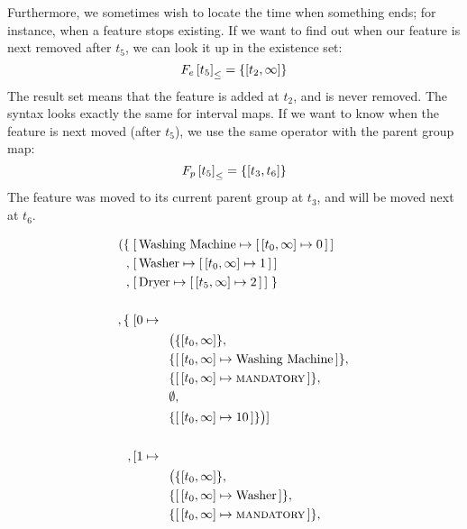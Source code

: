 Furthermore, we sometimes wish to locate the time when something ends; for instance, when a feature stops existing. If we want to find out when our feature is next removed after $t_5$, we can look it up in the existence set:
\[
  \containing{F_e}{t_5} = \set{\interval{t_2}{\forever}}
\]
The result set means that the feature is added at $t_2$, and is never removed. The syntax looks exactly the same for interval maps. If we want to know when the feature is next moved (after $t_5$), we use the same operator with the parent group map:
\[
  \containing{F_p}{t_5} = \set{\interval{t_3}{t_6}}
\]
The feature was moved to its current parent group at $t_3$, and will be moved next at $t_6$.

\begin{figure}[htpb]
  \begin{align*}
    ( \{ \; & \mapping{\text{Washing Machine}}{\intervalmapping{t_0}{\forever}{0}} \\
       ,\; & \mapping{\text{Washer}}{\intervalmapping{t_0}{\forever}{1}} \\
       ,\; & \mapping{\text{Dryer}}{\intervalmapping{t_5}{\forever}{2}}\; \} \\
       \\
       ,\{\; & [ 0 \mapsto \\
             & \hspace{1cm} \begin{aligned} & \big(\{ \interval{t_0}{\forever}\} ,\, \\
             & \{\intervalmapping{t_0}{\forever}{\text{Washing Machine}}\} ,\, \\
             & \{\intervalmapping{t_0}{\forever}{\mandatory{}}\} ,\, \\
             &  \emptyset ,\, \\ 
             & \{\intervalmapping{t_0}{\forever}{10}\} \big) ] \\
             \end{aligned}\\
             &\\
         ,\, & [ 1 \mapsto \\
              & \hspace{1cm} \begin{aligned} & \big(\{\interval{t_0}{\forever}\} ,\, \\
             & \{\intervalmapping{t_0}{\forever}{\text{Washer}}\} ,\, \\
             & \{\intervalmapping{t_0}{\forever}{\mandatory{}}\} ,\, \\

\end{aligned}
\end{align*}
\end{figure}
